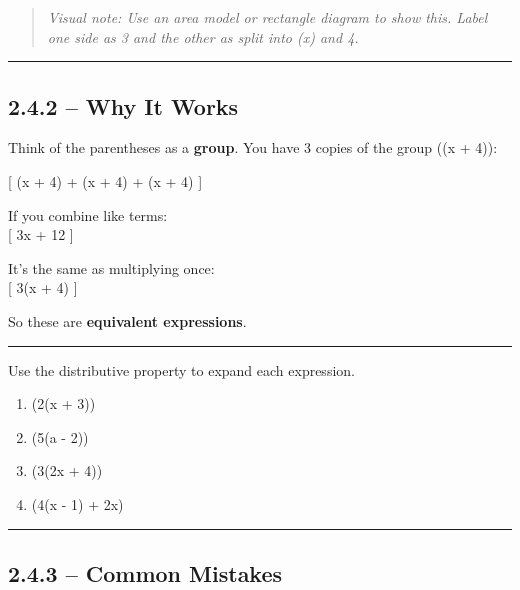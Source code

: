 \documentclass[
  letterpaper,
  DIV=11,
  numbers=noendperiod]{scrreprt}
\providecommand{\tightlist}{%
  \setlength{\itemsep}{0pt}\setlength{\parskip}{0pt}}
\begin{document}
\begin{quote}
\emph{Visual note: Use an area model or rectangle diagram to show this.
Label one side as 3 and the other as split into (x) and 4.}
\end{quote}

\begin{center}\rule{0.5\linewidth}{0.5pt}\end{center}

\subsection*{2.4.2 -- Why It Works}\label{why-it-works}

Think of the parentheses as a \textbf{group}. You have 3 copies of the
group ((x + 4)):

{[} (x + 4) + (x + 4) + (x + 4) {]}

If you combine like terms:\\
{[} 3x + 12 {]}

It's the same as multiplying once:\\
{[} 3(x + 4) {]}

So these are \textbf{equivalent expressions}.

\begin{center}\rule{0.5\linewidth}{0.5pt}\end{center}

Use the distributive property to expand each expression.

\begin{enumerate}
\def\labelenumi{\arabic{enumi}.}
\tightlist
\item
  (2(x + 3))\\
\item
  (5(a - 2))\\
\item
  (3(2x + 4))\\
\item
  (4(x - 1) + 2x)
\end{enumerate}

\begin{center}\rule{0.5\linewidth}{0.5pt}\end{center}

\subsection*{2.4.3 -- Common Mistakes}\label{common-mistakes}
\end{document}
